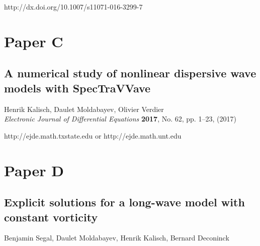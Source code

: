 \noindent http://dx.doi.org/10.1007/s11071-016-3299-7

\cleardoublepage



\chapter*{Paper C}

\section*{A numerical study of nonlinear dispersive wave models with SpecTraVVave}

\noindent Henrik Kalisch, Daulet Moldabayev, Olivier Verdier\\

\noindent \textit{Electronic Journal of Differential Equations} \textbf{2017},  No. 62, pp. 1--23, (2017)

\noindent http://ejde.math.txstate.edu or http://ejde.math.unt.edu

\cleardoublepage



\chapter*{Paper D}

\section*{Explicit solutions for a long-wave model with constant vorticity}

\noindent Benjamin Segal, Daulet Moldabayev, Henrik Kalisch, Bernard Deconinck\\

\cleardoublepage

